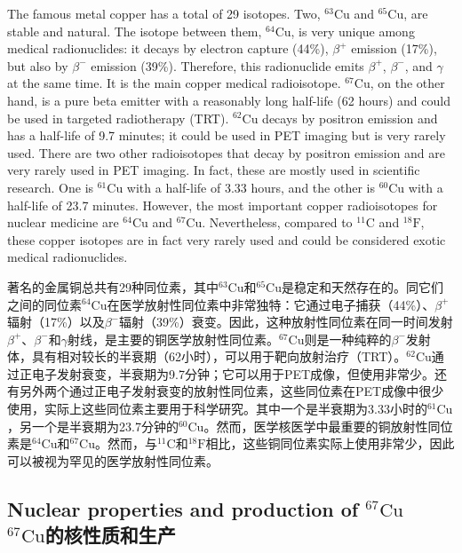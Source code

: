 \documentclass[dvipsnames, svgnames,a4paper,11pt]{article}
\begin{document}
The famous metal copper has a total of 29 isotopes. Two, \(\mathrm{^{63}Cu}\) and \(\mathrm{^{65}Cu}\), are stable and natural. The isotope between them, \(\mathrm{^{64}Cu}\), is very unique among medical radionuclides: it decays by electron capture (44\%), \(\beta^+\) emission (17\%), but also by \(\beta^-\) emission (39\%). Therefore, this radionuclide emits \(\beta^+\), \(\beta^-\), and \(\gamma\) at the same time. It is the main copper medical radioisotope. \(\mathrm{^{67}Cu}\), on the other hand, is a pure beta emitter with a reasonably long half-life (62 hours) and could be used in targeted radiotherapy (TRT). \(\mathrm{^{62}Cu}\) decays by positron emission and has a half-life of 9.7 minutes; it could be used in PET imaging but is very rarely used. There are two other radioisotopes that decay by positron emission and are very rarely used in PET imaging. In fact, these are mostly used in scientific research. One is \(\mathrm{^{61}Cu}\) with a half-life of 3.33 hours, and the other is \(\mathrm{^{60}Cu}\) with a half-life of 23.7 minutes. However, the most important copper radioisotopes for nuclear medicine are \(\mathrm{^{64}Cu}\) and \(\mathrm{^{67}Cu}\). Nevertheless, compared to \(\mathrm{^{11}C}\) and \(\mathrm{^{18}F}\), these copper isotopes are in fact very rarely used and could be considered exotic medical radionuclides.

著名的金属铜总共有29种同位素，其中\(\mathrm{^{63}Cu}\)和\(\mathrm{^{65}Cu}\)是稳定和天然存在的。同它们之间的同位素\(\mathrm{^{64}Cu}\)在医学放射性同位素中非常独特：它通过电子捕获（44\%）、\(\beta^+\)辐射（17\%）以及\(\beta^-\)辐射（39\%）衰变。因此，这种放射性同位素在同一时间发射\(\beta^+\)、\(\beta^-\)和\(\gamma\)射线，是主要的铜医学放射性同位素。\(\mathrm{^{67}Cu}\)则是一种纯粹的\(\beta^-\)发射体，具有相对较长的半衰期（62小时），可以用于靶向放射治疗（TRT）。\(\mathrm{^{62}Cu}\)通过正电子发射衰变，半衰期为9.7分钟；它可以用于PET成像，但使用非常少。还有另外两个通过正电子发射衰变的放射性同位素，这些同位素在PET成像中很少使用，实际上这些同位素主要用于科学研究。其中一个是半衰期为3.33小时的\(\mathrm{^{61}Cu}\)，另一个是半衰期为23.7分钟的\(\mathrm{^{60}Cu}\)。然而，医学核医学中最重要的铜放射性同位素是\(\mathrm{^{64}Cu}\)和\(\mathrm{^{67}Cu}\)。然而，与\(\mathrm{^{11}C}\)和\(\mathrm{^{18}F}\)相比，这些铜同位素实际上使用非常少，因此可以被视为罕见的医学放射性同位素。



\subsection{Nuclear properties and production of \(\mathrm{^{67}Cu}\)\\ \(\mathrm{^{67}Cu}\)的核性质和生产}  
\end{document}
